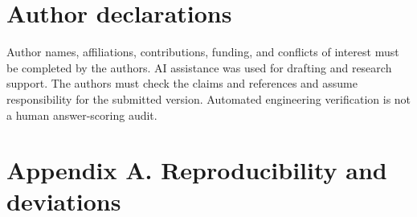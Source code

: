 \documentclass[11pt,a4paper]{article}
\begin{document}
\section*{Author declarations}\label{sec:author-declarations}
Author names, affiliations, contributions, funding, and conflicts of interest must be completed by the authors. AI assistance was used for drafting and research support. The authors must check the claims and references and assume responsibility for the submitted version. Automated engineering verification is not a human answer-scoring audit.

\clearpage
\section*{Appendix A. Reproducibility and deviations}\label{sec:appendix-a-reproducibility-and-deviations}
\end{document}
